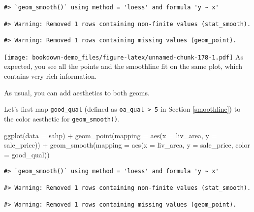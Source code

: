 \documentclass[
]{book}
\newenvironment{Shaded}{\begin{snugshade}}{\end{snugshade}}
\newcommand{\AttributeTok}[1]{\textcolor[rgb]{0.77,0.63,0.00}{#1}}
\newcommand{\FunctionTok}[1]{\textcolor[rgb]{0.00,0.00,0.00}{#1}}
\newcommand{\NormalTok}[1]{#1}
\newcommand{\SpecialCharTok}[1]{\textcolor[rgb]{0.00,0.00,0.00}{#1}}
\begin{document}
\begin{verbatim}
#> `geom_smooth()` using method = 'loess' and formula 'y ~ x'
\end{verbatim}

\begin{verbatim}
#> Warning: Removed 1 rows containing non-finite values (stat_smooth).
\end{verbatim}

\begin{verbatim}
#> Warning: Removed 1 rows containing missing values (geom_point).
\end{verbatim}

\texttt{[image: bookdown-demo\_files/figure-latex/unnamed-chunk-178-1.pdf]}
As expected, you see all the points and the smoothline fit on the same plot, which contains very rich information.

As usual, you can add aesthetics to both geoms.

Let's first map \texttt{good\_qual} (defined as \texttt{oa\_qual\ \textgreater{}\ 5} in Section \ref{smoothline}) to the color aesthetic for \texttt{geom\_smooth()}.

\begin{Shaded}
\begin{Highlighting}[]
\FunctionTok{ggplot}\NormalTok{(}\AttributeTok{data =}\NormalTok{ sahp) }\SpecialCharTok{+} \FunctionTok{geom\_point}\NormalTok{(}\AttributeTok{mapping =} \FunctionTok{aes}\NormalTok{(}\AttributeTok{x =}\NormalTok{ liv\_area, }\AttributeTok{y =}\NormalTok{ sale\_price)) }\SpecialCharTok{+} \FunctionTok{geom\_smooth}\NormalTok{(}\AttributeTok{mapping =} \FunctionTok{aes}\NormalTok{(}\AttributeTok{x =}\NormalTok{ liv\_area, }\AttributeTok{y =}\NormalTok{ sale\_price, }\AttributeTok{color =}\NormalTok{ good\_qual))}
\end{Highlighting}
\end{Shaded}

\begin{verbatim}
#> `geom_smooth()` using method = 'loess' and formula 'y ~ x'
\end{verbatim}

\begin{verbatim}
#> Warning: Removed 1 rows containing non-finite values (stat_smooth).
\end{verbatim}

\begin{verbatim}
#> Warning: Removed 1 rows containing missing values (geom_point).
\end{verbatim}
\end{document}
